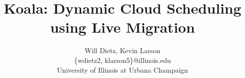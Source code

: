 \documentclass[letterpaper,twocolumn,12pt]{article}
\title{Koala: Dynamic Cloud Scheduling using Live Migration}
\author{\small Will Dietz, Kevin Larson\\
\small \{wdietz2, klarson5\}@illinois.edu\\
\small University of Illinois at Urbana Champaign}
\date{}
\begin{document}
\maketitle










\footnotesize



\normalsize
\clearpage

\end{document}
